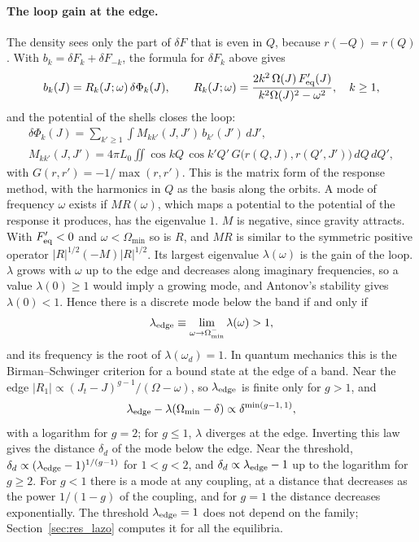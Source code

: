 \documentclass[11pt,a4paper]{article}
\begin{document}
\paragraph{The loop gain at the edge.}
\label{sec:lazo}
The density sees only the part of $\delta F$ that is even in $Q$, because $r(-Q)=r(Q)$. With
$b_k=\delta F_k+\delta F_{-k}$, the formula for $\delta F_k$ above gives
\[
  b_k(J)=R_k(J;\omega)\,\delta\Phi_k(J),\qquad
  R_k(J;\omega)=\frac{2k^2\,\Omega(J)\,F_{\rm eq}'(J)}{k^2\Omega(J)^2-\omega^2},\quad k\ge1,
\]
and the potential of the shells closes the loop:
\begin{gather*}
  \delta\Phi_k(J)=\sum_{k'\ge1}\int M_{kk'}(J,J')\,b_{k'}(J')\,dJ',\\
  M_{kk'}(J,J')=4\pi L_0\iint\cos kQ\,\cos k'Q'\,G\big(r(Q,J),r(Q',J')\big)\,dQ\,dQ',
\end{gather*}
with $G(r,r')=-1/\max(r,r')$. This is the matrix form of the response method, with the harmonics in $Q$ as the basis
along the orbits. A mode of frequency $\omega$ exists if $MR(\omega)$, which maps a potential to
the potential of the response it produces, has the eigenvalue $1$. $M$ is negative, since
gravity attracts. With $F_{\rm eq}'<0$ and $\omega<\Omega_{\min}$ so is $R$, and $MR$ is similar to the
symmetric positive operator $|R|^{1/2}(-M)|R|^{1/2}$. Its largest eigenvalue $\lambda(\omega)$ is the
gain of the loop. $\lambda$ grows with $\omega$ up to the edge and decreases along imaginary
frequencies, so a value $\lambda(0)\ge1$ would imply a growing mode, and Antonov's stability
gives $\lambda(0)<1$. Hence there is a discrete mode below the band if and only if
\[
  \lambda_{\rm edge}\equiv\lim_{\omega\to\Omega_{\min}^-}\lambda(\omega)>1,
\]
and its frequency is the root of $\lambda(\omega_d)=1$. In quantum mechanics this is the
Birman--Schwinger criterion for a bound state at the edge of a band. Near the edge
$|R_1|\propto(J_t-J)^{g-1}/(\Omega-\omega)$, so $\lambda_{\rm edge}$ is finite only for $g>1$, and
\[
  \lambda_{\rm edge}-\lambda(\Omega_{\min}-\delta)\propto\delta^{\min(g-1,\,1)},
\]
with a logarithm for $g=2$; for $g\le1$, $\lambda$ diverges at the edge. Inverting this law
gives the distance $\delta_d$ of the mode below the edge. Near the threshold,
$\delta_d\propto(\lambda_{\rm edge}-1)^{1/(g-1)}$ for $1<g<2$, and $\delta_d\propto\lambda_{\rm edge}-1$ up to the logarithm
for $g\ge2$. For $g<1$ there is a mode at any coupling, at a distance that decreases as the
power $1/(1-g)$ of the coupling, and for $g=1$ the distance decreases exponentially. The
threshold $\lambda_{\rm edge}=1$ does not depend on the family; Section~\ref{sec:res_lazo}
computes it for all the equilibria.
\end{document}
